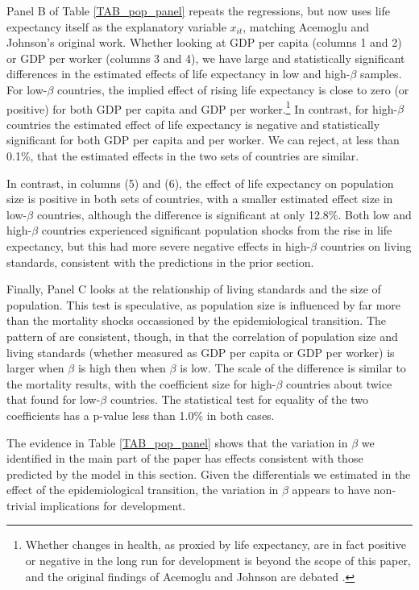 \documentclass[11pt]{article}
\begin{document}
Panel B of Table \ref{TAB_pop_panel} repeats the regressions, but now uses life expectancy itself as the explanatory variable $x_{it}$, matching Acemoglu and Johnson's original work. Whether looking at GDP per capita (columns 1 and 2) or GDP per worker (columns 3 and 4), we have large and statistically significant differences in the estimated effects of life expectancy in low and high-$\beta$ samples. For low-$\beta$ countries, the implied effect of rising life expectancy is close to zero (or positive) for both GDP per capita and GDP per worker.\footnote{Whether changes in health, as proxied by life expectancy, are in fact positive or negative in the long run for development is beyond the scope of this paper, and the original findings of Acemoglu and Johnson are debated \citep{bcf2014}.} In contrast, for high-$\beta$ countries the estimated effect of life expectancy is negative and statistically significant for both GDP per capita and per worker. We can reject, at less than 0.1\%, that the estimated effects in the two sets of countries are similar. 

In contrast, in columns (5) and (6), the effect of life expectancy on population size is positive in both sets of countries, with a smaller estimated effect size in low-$\beta$ countries, although the difference is significant at only 12.8\%. Both low and high-$\beta$ countries experienced significant population shocks from the rise in life expectancy, but this had more severe negative effects in high-$\beta$ countries on living standards, consistent with the predictions in the prior section.

Finally, Panel C looks at the relationship of living standards and the size of population. This test is speculative, as population size is influenced by far more than the mortality shocks occassioned by the epidemiological transition. The pattern of are consistent, though, in that the correlation of population size and living standards (whether measured as GDP per capita or GDP per worker) is larger when $\beta$ is high then when $\beta$ is low. The scale of the difference is similar to the mortality results, with the coefficient size for high-$\beta$ countries about twice that found for low-$\beta$ countries. The statistical test for equality of the two coefficients has a p-value less than 1.0\% in both cases.

The evidence in Table \ref{TAB_pop_panel} shows that the variation in $\beta$ we identified in the main part of the paper has effects consistent with those predicted by the model in this section. Given the differentials we estimated in the effect of the epidemiological transition, the variation in $\beta$ appears to have non-trivial implications for development.
\end{document}

